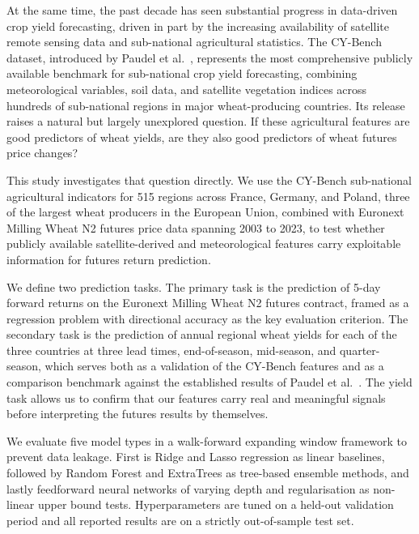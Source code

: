 \documentclass[pdflatex,sn-mathphys-num, oneside]{sn-jnl}%
\theoremstyle{thmstyleone}%
\theoremstyle{thmstyletwo}%
\theoremstyle{thmstylethree}%
\begin{document}
At the same time, the past decade has seen substantial progress in data-driven crop yield forecasting, driven in part by the increasing availability of satellite remote sensing data and sub-national agricultural statistics. The CY-Bench dataset, introduced by Paudel et al.~\cite{bib17}, represents the most comprehensive publicly available benchmark for sub-national crop yield forecasting, combining meteorological variables, soil data, and satellite vegetation indices across hundreds of sub-national regions in major wheat-producing countries. Its release raises a natural but largely unexplored question. If these agricultural features are good predictors of wheat yields, are they also good predictors of wheat futures price changes?

This study investigates that question directly. We use the CY-Bench sub-national agricultural indicators for 515 regions across France, Germany, and Poland, three of the largest wheat producers in the European Union, combined with Euronext Milling Wheat N2 futures price data spanning 2003 to 2023, to test whether publicly available satellite-derived and meteorological features carry exploitable information for futures return prediction. 

We define two prediction tasks. The primary task is the prediction of 5-day forward returns on the Euronext Milling Wheat N2 futures contract, framed as a regression problem with directional accuracy as the key evaluation criterion. The secondary task is the prediction of annual regional wheat yields for each of the three countries at three lead times, end-of-season, mid-season, and quarter-season, which serves both as a validation of the CY-Bench features and as a comparison benchmark against the established results of Paudel et al.~\cite{bib16,bib17}. The yield task allows us to confirm that our features carry real and meaningful signals before interpreting the futures results by themselves.

We evaluate five model types in a walk-forward expanding window framework to prevent data leakage. First is Ridge and Lasso regression as linear baselines, followed by Random Forest and ExtraTrees as tree-based ensemble methods, and lastly feedforward neural networks of varying depth and regularisation as non-linear upper bound tests. Hyperparameters are tuned on a held-out validation period and all reported results are on a strictly out-of-sample test set.
\end{document}
